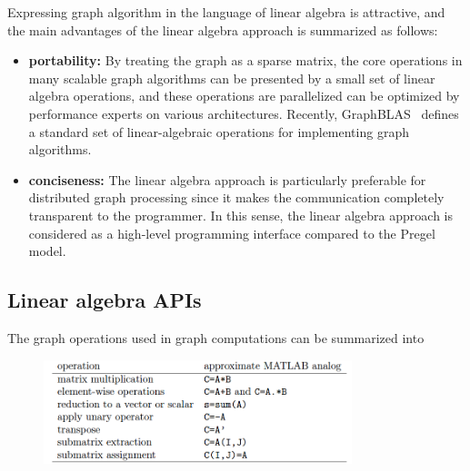 \documentclass{sokendai_thesis} %
\begin{document}
Expressing graph algorithm in the language of linear algebra is attractive, and the main advantages of the linear algebra approach is summarized as follows:
\begin{itemize}
  \item \textbf{portability:}
    By treating the graph as a sparse matrix, the core operations in many scalable graph algorithms can be presented by a small set of linear algebra operations, and these operations are parallelized can be optimized by performance experts on various architectures.
    Recently, GraphBLAS~\cite{graphblas} defines a standard set of linear-algebraic operations for implementing graph algorithms.

  \item \textbf{conciseness:}
    The linear algebra approach is particularly preferable for distributed graph processing since it makes the communication completely transparent to the programmer.
    In this sense, the linear algebra approach is considered as a high-level programming interface compared to the Pregel model.
\end{itemize}



\subsection{Linear algebra APIs}



The graph operations used in graph computations can be summarized into 
\begin{figure}
\centering
\includegraphics[width=0.8\textwidth]{figures/linear-algebra-apis.png}
\caption{}
\end{figure}
\end{document}
